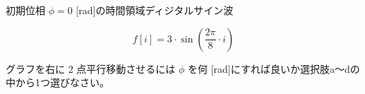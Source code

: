 初期位相 $\phi = 0$ [rad]の時間領域ディジタルサイン波 

\[
f[i] = 3 \cdot \sin \left ( \frac{2 \pi}{8}  \cdot i \right )
\]

\noindent グラフを右に $2$ 点平行移動させるには $\phi$ を何 [rad]にすれば良いか選択肢a〜dの中から1つ選びなさい。
